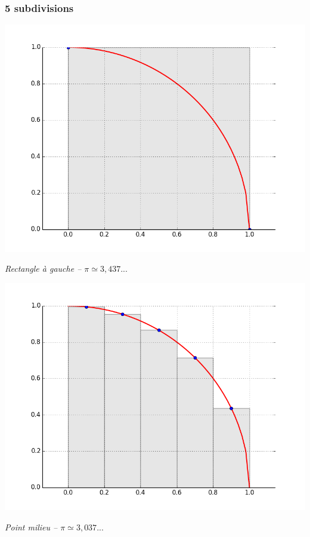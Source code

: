 \documentclass[10pt]{article}
\begin{document}
\subsubsection*{5 subdivisions}

\begin{minipage}[c]{.32\linewidth}
\begin{center}
\includegraphics[width=.99\textwidth]{images/CourbesPython/pi_rect_g}

\textit{Rectangle à gauche -- $\pi \simeq 3,437...$  }
\end{center}
\end{minipage}\hfill
\begin{minipage}[c]{.32\linewidth}
\begin{center}
\includegraphics[width=.99\textwidth]{images/CourbesPython/pi_rect_m}

\textit{Point milieu -- $\pi \simeq 3,037...$}
\end{center}
\end{minipage}\hfill
\end{document}
